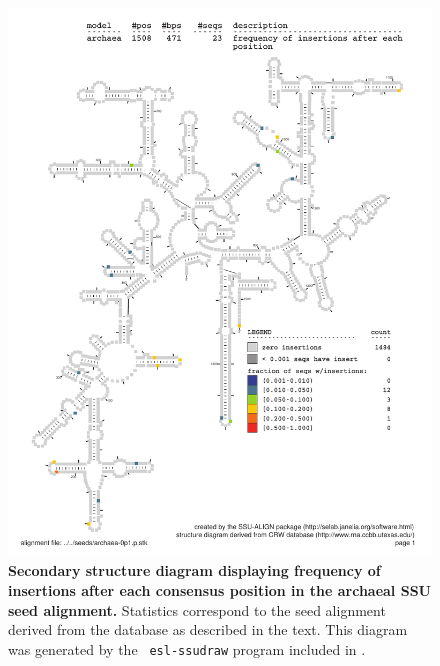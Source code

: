 \begin{figure}
\begin{center}
\includegraphics[width=5.7in]{Figures/archaea-0p1-ifreq}
\end{center}
\caption[Secondary structure diagram displaying frequency of insertions
  after each consensus position in the archaeal SSU seed
  alignment]{\textbf{Secondary structure diagram displaying frequency
  of insertions after each consensus position in the archaeal SSU seed
  alignment.} Statistics correspond to the  seed
  alignment derived from the  database \cite{CannoneGutell02}
  as described in the text. This diagram was generated by the {\tt
  esl-ssudraw} program included in .}
\label{fig:arcins}
\end{figure}


